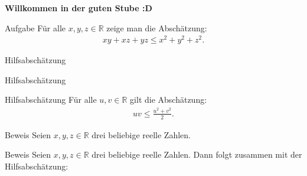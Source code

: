 \documentclass[10pt]{beamer}
\title{}
\author{Artur's Mathematikstübchen}
\date{}
\def\bR{\mathbb{R}}
\begin{document}

\begin{frame}
    \begin{center}
        \textbf{\huge Willkommen in der guten Stube \newline \newline :D}
    \end{center}
\end{frame}




\begin{frame}
    \begin{alertblock}{Aufgabe}
        Für alle \( x, y, z \in \bR \) zeige man die Abschätzung:
        \begin{align*}
            xy + xz + yz
            \leq x^{2} + y^{2} + z^{2}.
        \end{align*}
    \end{alertblock}
\end{frame}



\begin{frame}{Hilfsabschätzung}
    
\end{frame}



\begin{frame}{Hilfsabschätzung}
    \begin{block}{Hilfsabschätzung}
        Für alle \( u, v \in \bR \) gilt die Abschätzung:
        \begin{align*}
            uv
            \leq \frac{u^{2} + v^{2}}{2}.
        \end{align*}
    \end{block}
\end{frame}



\begin{frame}{Beweis}
    Seien \( x, y, z \in \bR \) drei beliebige reelle Zahlen.
\end{frame}



\begin{frame}{Beweis}
    Seien \( x, y, z \in \bR \) drei beliebige reelle Zahlen. Dann folgt zusammen mit der Hilfsabschätzung:
\end{frame}
\end{document}
